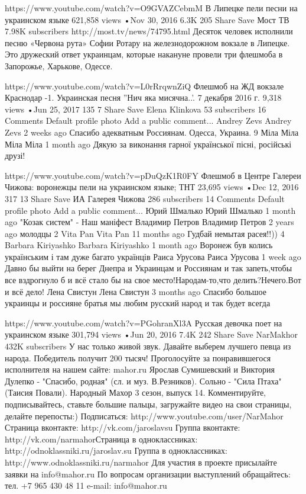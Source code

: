 https://www.youtube.com/watch?v=O9GVAZCebmM
В Липецке пели песни на украинском языке
621,858 views
•Nov 30, 2016
6.3K
205
Share
Save
Мост ТВ
7.98K subscribers
http://most.tv/news/74795.html
Десяток человек исполнили песню «Червона рута» Софии Ротару на железнодорожном вокзале в Липецке. Это дружеский ответ украинцам, которые накануне провели три флешмоба в Запорожье, Харькове, Одессе.

https://www.youtube.com/watch?v=L0rRrqwnZiQ
Флешмоб на ЖД вокзале Краснодар -1. Украинская песня ''Нич яка мисячна..'. 7 декабря 2016 г.
9,318 views
•Jun 25, 2017
135
7
Share
Save
Elena Klinkova
53 subscribers
16 Comments
Default profile photo
Add a public comment...
Andrey Zevs
Andrey Zevs
2 weeks ago
Спасибо адекватным Россиянам. Одесса, Украина.
9
Міла Міла
Міла Міла
1 month ago
Дякую за виконання гарної української пісні, російські друзі! 


https://www.youtube.com/watch?v=pDuQzK1R0FY
Флешмоб в Центре Галереи Чижова: воронежцы пели на украинском языке; ТНТ
23,695 views
•Dec 12, 2016
317
13
Share
Save
ИА Галерея Чижова
286 subscribers
14 Comments
Default profile photo
Add a public comment...
Юрий Шмалько
Юрий Шмалько
1 month ago
"Козак систем" - Наш маніфест
Владимир Петров
Владимир Петров
2 years ago
молодцы
2
Vita Pan
Vita Pan
11 months ago
Гудбай немытая расея!!))
4
Barbara Kiriyashko
Barbara Kiriyashko
1 month ago
Воронеж був колись українським і там дуже багато українців
Раиса Урусова
Раиса Урусова
1 week ago
Давно бы выйти на берег Днепра и Украинцам и Россиянам и так запеть,чтобы все вздрогнуло б и всё стало бы на свое место!Народам-то,что делить?Нечего.Вот и всё дело!
Лена Свистун
Лена Свистун
3 months ago
Спасибо большое украинцы и россияне братья мы любим русский народ и так будет всегда 

https://www.youtube.com/watch?v=PGohranXl3A
Русская девочка поет на украинском языке
301,794 views
•Jun 20, 2016
7.4K
242
Share
Save
NarMakhor
432K subscribers
У нас только живой звук. Давайте выберем лучшего певца из народа. Победитель получит 200 тысяч! Проголосуйте за понравившегося исполнителя на нашем сайте: mahor.ru
Ярослав Сумишевский и Виктория Дулепко - "Спасибо, родная" (сл. и муз. В.Резников). Сольно - "Сила Птаха" (Таисия Повали).
Народный Махор 3 сезон, выпуск 14.
Комментируйте, подписывайтесь, ставьте большие пальцы, загружайте видео на свои страницы, делайте перепосты:)
Подписаться:
http://www.youtube.com/user/NarMahor​
Страница вконтакте:
http://vk.com/jaroslavsu​
Группа вконтакте:
http://vk.com/narmahor​
Страница в одноклассниках:
http://odnoklassniki.ru/jaroslav.su​
Группа в одноклассниках:
http://www.odnoklassniki.ru/narmahor​
Для участия в проекте присылайте заявки на info@mahor.ru
По вопросам организации выступлений обращайтесь:
тел. +7 965 430 48 11
e-mail: info@mahor.ru

